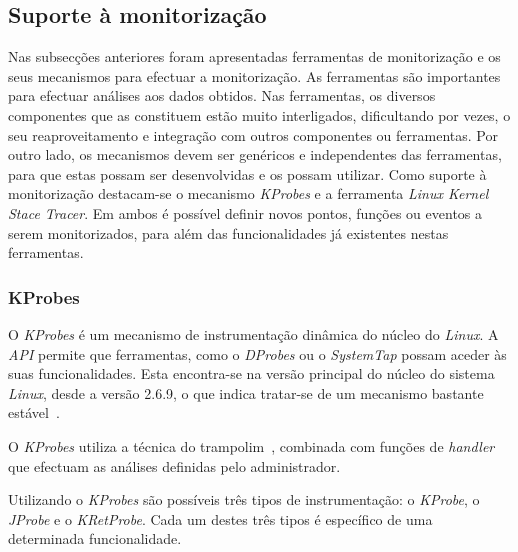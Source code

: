 
\subsection{Suporte à monitorização}

Nas subsecções anteriores foram apresentadas ferramentas de monitorização e os seus mecanismos para efectuar a monitorização.
As ferramentas são importantes para efectuar análises aos dados obtidos.
Nas ferramentas, os diversos componentes que as constituem estão muito interligados, dificultando por vezes, o seu reaproveitamento e integração com outros componentes ou ferramentas.
Por outro lado, os mecanismos devem ser genéricos e independentes das ferramentas, para que estas possam ser desenvolvidas e os possam utilizar.
Como suporte à monitorização destacam-se o mecanismo \textit{KProbes} e a ferramenta \textit{Linux Kernel Stace Tracer}.
Em ambos é possível definir novos pontos, funções ou eventos a serem monitorizados, para além das funcionalidades já existentes nestas ferramentas.

\subsubsection{KProbes}\label{sect:KProbes_overview}

O \textit{KProbes} é um mecanismo de instrumentação dinâmica do núcleo do \textit{Linux}.
A \textit{API} permite que ferramentas, como o \textit{DProbes} ou o \textit{SystemTap} possam aceder às suas funcionalidades.
Esta encontra-se na versão principal do núcleo do sistema \textit{Linux}, desde a versão 2.6.9, o que indica tratar-se de um mecanismo bastante estável~\cite{kernel_debug_printk_on_fly,KProbesSite}.

O \textit{KProbes} utiliza a técnica do trampolim~\cite{Hollingsworth94dynamicprogram}, combinada com funções de \textit{handler} que efectuam as análises definidas pelo administrador.

Utilizando o \textit{KProbes} são possíveis três tipos de instrumentação: o \textit{KProbe}, o \textit{JProbe} e o \textit{KRetProbe}.
Cada um destes três tipos é específico de uma determinada funcionalidade.

